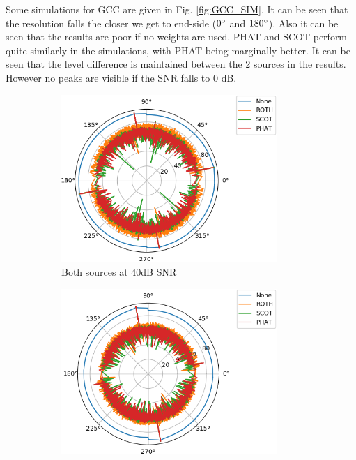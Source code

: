 Some simulations for GCC are given in Fig. \ref{fig:GCC_SIM}. It can be seen that the resolution falls the closer we get to end-side ($0\degree$ and $180\degree$). Also it can be seen that the results are poor if no weights are used. PHAT and SCOT perform quite similarly in the simulations, with PHAT being marginally better. It can be seen that the level difference is maintained between the 2 sources in the results. However no peaks are visible if the SNR falls to 0 dB.

\begin{figure}[h]
    \centering
    \begin{subfigure}[b]{0.48\textwidth}
    \centering
    \includegraphics[width=0.9\textwidth]{Figures/GCC_40.png}
    \caption{Both sources at 40dB SNR}
    \label{fig:d1}
\end{subfigure}
\hfill
\begin{subfigure}[b]{0.48\textwidth}
    \centering
    \includegraphics[width=0.9\textwidth]{Figures/GCC_20_40.png}

\end{subfigure}
\end{figure}
